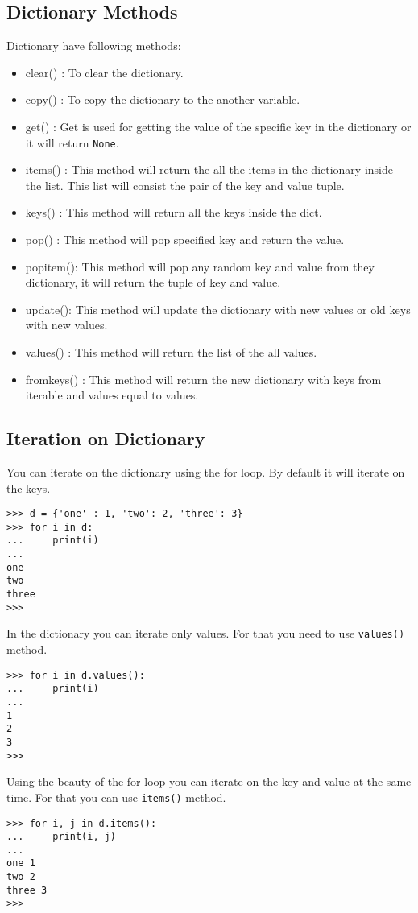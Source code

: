 \documentclass[letterpaper,12pt]{book}
\begin{document}
\subsection{Dictionary Methods}
Dictionary have following methods:
\begin{itemize}
\item clear() : To clear the dictionary.
\item copy() : To copy the dictionary to the another variable.
\item get() : Get is used for getting the value of the specific key in the dictionary or it will return \texttt{None}.
\item items() : This method will return the all the items in the dictionary inside the list. This list will consist the pair of the key and value tuple.
\item keys() : This method will return all the keys inside the dict.
\item pop() : This method will pop specified key and return the value.
\item popitem(): This method will pop any random key and value from they dictionary, it will return the tuple of key and value.
\item update(): This method will update the dictionary with new values or old keys with new values.
\item values() : This method will return the list of the all values.
\item fromkeys() : This method will return the new dictionary with keys from iterable and values equal to values.
\end{itemize}
\subsection{Iteration on Dictionary}
You can iterate on the dictionary using the for loop. By default it will iterate on the keys.
\begin{verbatim}
>>> d = {'one' : 1, 'two': 2, 'three': 3}
>>> for i in d:
...     print(i)
... 
one
two
three
>>> 
\end{verbatim}
In the dictionary you can iterate only values. For that you need to use \texttt{values()} method.
\begin{verbatim}
>>> for i in d.values():
...     print(i)
... 
1
2
3
>>> 
\end{verbatim}
Using the beauty of the for loop you can iterate on the key and value  at the same time. For that you can use \texttt{items()} method.
\begin{verbatim}
>>> for i, j in d.items():
...     print(i, j)
... 
one 1
two 2
three 3
>>> 
\end{verbatim}
\end{document}
